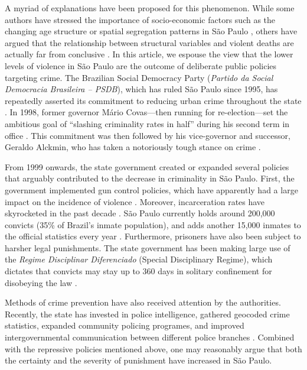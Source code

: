 \documentclass[a4paper,11pt]{article}
\begin{document}
A myriad of explanations have been proposed for this phenomenon. While some authors have stressed the importance of socio-economic factors such as the changing age structure \citep{mello2010} or spatial segregation patterns in S\~{a}o Paulo \citep{hughes2004}, others have argued that the relationship between structural variables and violent deaths are actually far from conclusive \citep{mendonca2003}. In this article, we espouse the view that the lower levels of violence in S\~{a}o Paulo are the outcome of deliberate public policies targeting crime. The Brazilian Social Democracy Party (\textit{Partido da Social Democracia Brasileira -- PSDB}), which has ruled S\~{a}o Paulo since 1995, has repeatedly asserted its commitment to reducing urban crime throughout the state \citep{bueno2014}. In 1998, former governor M\'{a}rio Covas---then running for re-election---set the ambitious goal of ``slashing criminality rates in half'' during his second term in office \citep{santos2008}. This commitment was then followed by his vice-governor and successor, Geraldo Alckmin, who has taken a notoriously tough stance on crime \citep{feltran2012}. 

From 1999 onwards, the state government created or expanded several policies that arguably contributed to the decrease in criminality in S\~{a}o Paulo. First, the government implemented gun control policies, which have apparently had a large impact on the incidence of violence \citep{goertzel2009, nadanovsky2009}. Moreover, incarceration rates have skyrocketed in the past decade \citep{salla2007}. S\~{a}o Paulo currently holds around 200,000 convicts (35\% of Brazil's inmate population), and adds another 15,000 inmates to the official statistics every year \citep{brasildefato2013}. Furthermore, prisoners have also been subject to harsher legal punishments. The state government has been making large use of the \textit{Regime Disciplinar Diferenciado} (Special Disciplinary Regime), which dictates that convicts may stay up to 360 days in solitary confinement for disobeying the law \citep{carvalho2005}. 

Methods of crime prevention have also received attention by the authorities. Recently, the state has invested in police intelligence, gathered geocoded crime statistics, expanded community policing programes, and improved intergovernmental communication between different police branches \citep{goertzel2009}. Combined with the repressive policies mentioned above, one may reasonably argue that both the certainty and the severity of punishment \citep{becker1974} have increased in S\~{a}o Paulo.
\end{document}
